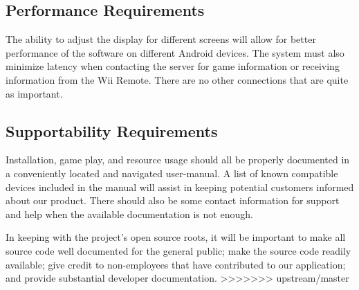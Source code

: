 \documentclass[12pt]{article}
\newenvironment{itemize*}%
  {\begin{itemize}%
  	\setlength{\parsep}{0pt}
    \setlength{\itemsep}{0pt}%
    \setlength{\parskip}{0pt}}%
  {\end{itemize}}
\begin{document}
\begin{itemize*}
\subsection{Performance Requirements}
The ability to adjust the display for different screens will allow for better performance of the software on different Android devices.  The system must also minimize latency when contacting the server for game information or receiving information from the Wii Remote.  There are no other connections that are quite as important.

\subsection{Supportability Requirements}
Installation, game play, and resource usage should all be properly documented in a conveniently located and navigated user-manual. A list of known compatible devices included in the manual will assist in keeping potential customers informed about our product.  There should also be some contact information for support and help when the available documentation is not enough.

In keeping with the project's open source roots, it will be important to make all source code well documented for the general public; make the source code readily available; give credit to non-employees that have contributed to our application; and provide substantial developer documentation. 
>>>>>>> upstream/master



\end{itemize*}
\end{document}
